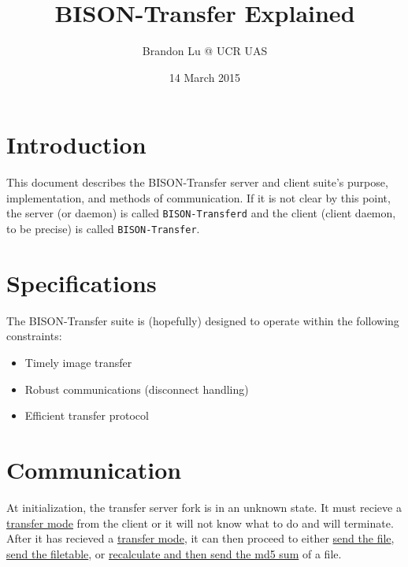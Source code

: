 \documentclass[12pt]{article}
\author{Brandon Lu @ UCR UAS}
\title{BISON-Transfer Explained}
\date{14 March 2015}
\begin{document}
\maketitle
\section{Introduction}
This document describes the BISON-Transfer server and client suite's purpose,
implementation, and methods of communication.
If it is not clear by this point, the server (or daemon)
is called \verb+BISON-Transferd+ and the client (client daemon, to be precise)
is called \verb+BISON-Transfer+.

\section{Specifications}
The BISON-Transfer suite is (hopefully) designed to operate within the
following constraints:
\begin{itemize}
	\item Timely image transfer
	\item Robust communications (disconnect handling)
	\item Efficient transfer protocol
\end{itemize}

\tableofcontents

\section{Communication}
At initialization, the transfer server fork is in an unknown state.  It must
recieve a \hyperref[sec:transfer_modes]{transfer mode} from the client or it
will not know what to
do and will terminate.
After it has recieved a \hyperref[sec:transfer_modes]{transfer mode}, it can
then proceed to either \hyperref[sec:request_file]{send the file},
\hyperref[sec:request_filetable]{send the filetable},
or \hyperref[sec:recalculate_MD5]
{recalculate and then send the md5 sum} of a file. 
\end{document}
